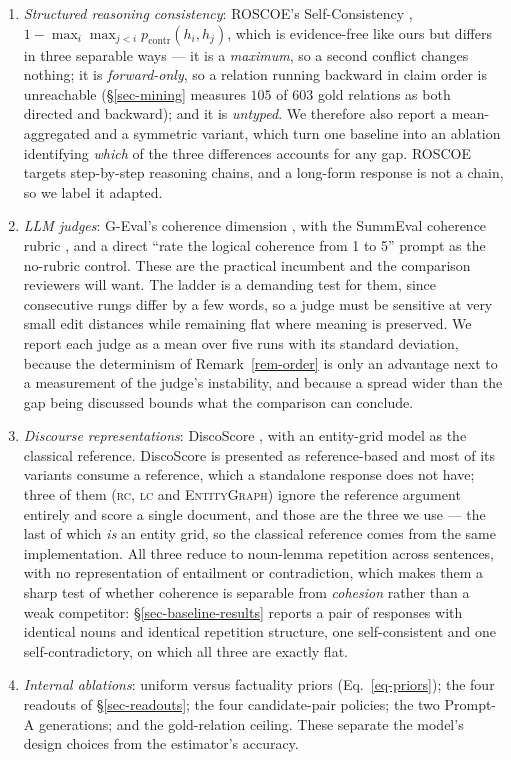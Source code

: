 \begin{enumerate}[leftmargin=1.6em,itemsep=2pt,topsep=3pt]
\item \emph{Structured reasoning consistency}: ROSCOE's Self-Consistency \citep{roscoe},
  $1-\max_{i}\max_{j<i} p_{\mathrm{contr}}(h_i,h_j)$, which is evidence-free like ours but differs
  in three separable ways --- it is a \emph{maximum}, so a second conflict changes nothing; it is
  \emph{forward-only}, so a relation running backward in claim order is unreachable (\S\ref{sec-mining}
  measures $105$ of $603$ gold relations as both directed and backward); and it is \emph{untyped}. We
  therefore also report a mean-aggregated and a symmetric variant, which turn one baseline into an
  ablation identifying \emph{which} of the three differences accounts for any gap. ROSCOE targets
  step-by-step reasoning chains, and a long-form response is not a chain, so we label it adapted.
\item \emph{LLM judges}: G-Eval's coherence dimension \citep{geval}, with the SummEval coherence
  rubric \citep{summeval}, and a direct ``rate the logical coherence from 1 to 5'' prompt as the
  no-rubric control. These are the practical incumbent and the comparison reviewers will want. The
  ladder is a demanding test for them, since consecutive rungs differ by a few words, so a judge must
  be sensitive at very small edit distances while remaining flat where meaning is preserved. We report
  each judge as a mean over five runs with its standard deviation, because the determinism of
  Remark~\ref{rem-order} is only an advantage next to a measurement of the judge's instability, and
  because a spread wider than the gap being discussed bounds what the comparison can conclude.
\item \emph{Discourse representations}: DiscoScore \citep{discoscore}, with an entity-grid model
  \citep{barzilay} as the classical reference. DiscoScore is presented as reference-based and most of
  its variants consume a reference, which a standalone response does not have; three of them
  (\textsc{rc}, \textsc{lc} and \textsc{EntityGraph}) ignore the reference argument entirely and score
  a single document, and those are the three we use --- the last of which \emph{is} an entity grid,
  so the classical reference comes from the same implementation. All three reduce to noun-lemma
  repetition across sentences, with no representation of entailment or contradiction, which makes
  them a sharp test of whether coherence is separable from \emph{cohesion} rather than a weak
  competitor: \S\ref{sec-baseline-results} reports a pair of responses with identical nouns and
  identical repetition structure, one self-consistent and one self-contradictory, on which all three
  are exactly flat.
\item \emph{Internal ablations}: uniform versus factuality priors (Eq.~\ref{eq-priors}); the four
  readouts of \S\ref{sec-readouts}; the four candidate-pair policies; the two Prompt-A generations;
  and the gold-relation ceiling. These separate the model's design choices from the estimator's
  accuracy.
\end{enumerate}

